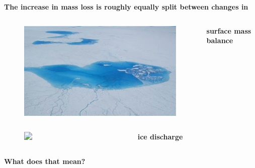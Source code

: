 \documentclass[hide notes,intlimits]{beamer}
\begin{document}
\begin{frame}[plain]
  \textbf{The increase in mass loss is roughly equally split between changes in}
  \begin{columns}[c]
    \begin{column}{.3\linewidth}
      \begin{figure}
        \includegraphics[width=\linewidth]{gris-melt-ponds}
      \end{figure}
    \end{column}
    \begin{column}{.3\linewidth}
      \textbf{surface mass balance}
    \end{column}
  \end{columns}
  \begin{columns}[c]
    \begin{column}{.3\linewidth}
      \begin{figure}
        \includegraphics<1>[width=\linewidth]{storeglacier}
      \end{figure}
    \end{column}
    \begin{column}{.3\linewidth}
      \textbf{ice discharge}
    \end{column}
  \end{columns}
  \bigskip
  \textbf{What does that mean?}
  \note[item]{}
\end{frame}


{
%
} 
\end{document}
